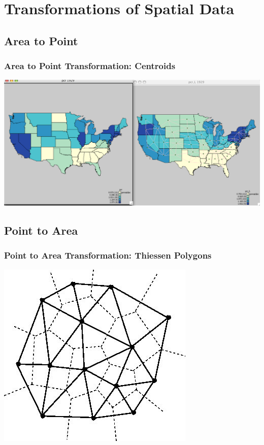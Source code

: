 \documentclass[nototal]{beamer}
\begin{document}
\section{Transformations of Spatial Data}
\subsection{Area to Point}
\begin{frame}
  \frametitle{Area to Point Transformation: Centroids}
    \begin{center}
      \includegraphics[width=.65\linewidth]{area2point}
    \end{center}
  \end{frame}

\subsection{Point to Area}
\begin{frame}
  \frametitle{Point to Area Transformation: Thiessen Polygons}
    \begin{center}
      \includegraphics[width=.65\linewidth]{dt.jpg}
    \end{center}
  \end{frame}
\end{document}
